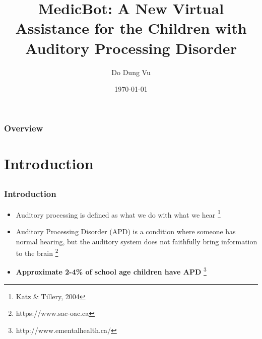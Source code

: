 \documentclass{beamer}
\title[Short title]{MedicBot: A New Virtual Assistance for the Children with Auditory Processing Disorder } %
\author{Do Dung Vu} %
\institute[ETS] %
{
Département de génie logiciel et des TI \\ %
\medskip
\textit{do-dung.vu.1@ens.etsmtl.ca } %
}
\date{\today} %
\begin{document}
\begin{frame}
\titlepage %
\end{frame}

\begin{frame}
\frametitle{Overview} %
\tableofcontents %
\end{frame}


\section{Introduction} %

\subsection{} %

\begin{frame}
\frametitle{Introduction}
\begin{itemize}
	\item Auditory processing is defined as what we do with what we hear \footnote{Katz  \&  Tillery,  2004}
	\item Auditory Processing Disorder (APD) is a condition where someone has normal hearing, but the auditory system does not faithfully bring information to the brain \footnote{https://www.sac-oac.ca}
	\item \textbf{Approximate 2-4\% of school age children have APD} \footnote{http://www.ementalhealth.ca/}
\end{itemize}

\end{frame}
\end{document}
